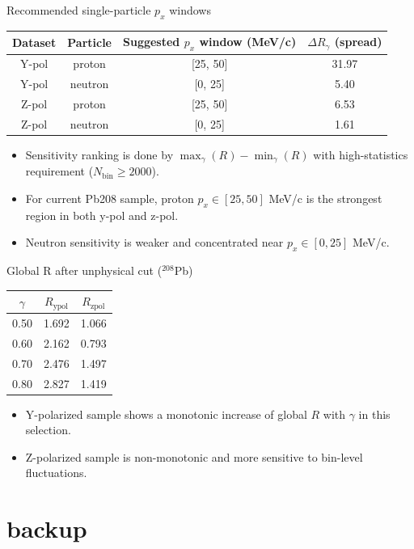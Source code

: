 \documentclass[aspectratio=169]{beamer}
\begin{document}
\begin{frame}{Recommended single-particle $p_x$ windows}
\centering
\begin{tabular}{c c c c}
\toprule
Dataset & Particle & Suggested \(p_x\) window (MeV/c) & \(\Delta R_\gamma\) (spread) \\
\midrule
Y-pol & proton & [25, 50] & 31.97 \\
Y-pol & neutron & [0, 25] & 5.40 \\
Z-pol & proton & [25, 50] & 6.53 \\
Z-pol & neutron & [0, 25] & 1.61 \\
\bottomrule
\end{tabular}
\vspace{0.2cm}

\begin{itemize}
    \item Sensitivity ranking is done by \(\max_\gamma(R)-\min_\gamma(R)\) with high-statistics requirement (\(N_{\mathrm{bin}}\ge 2000\)).
    \item For current Pb208 sample, proton \(p_x\in[25,50]\) MeV/c is the strongest region in both y-pol and z-pol.
    \item Neutron sensitivity is weaker and concentrated near \(p_x\in[0,25]\) MeV/c.
\end{itemize}
\end{frame}

\begin{frame}{Global R after unphysical cut (\(^{208}\)Pb)}
\centering
\begin{tabular}{c c c}
\toprule
\(\gamma\) & \(R_{\mathrm{ypol}}\) & \(R_{\mathrm{zpol}}\) \\
\midrule
0.50 & 1.692 & 1.066 \\
0.60 & 2.162 & 0.793 \\
0.70 & 2.476 & 1.497 \\
0.80 & 2.827 & 1.419 \\
\bottomrule
\end{tabular}
\vspace{0.25cm}

\begin{itemize}
    \item Y-polarized sample shows a monotonic increase of global \(R\) with \(\gamma\) in this selection.
    \item Z-polarized sample is non-monotonic and more sensitive to bin-level fluctuations.
\end{itemize}
\end{frame}


\section*{backup}
\end{document}
